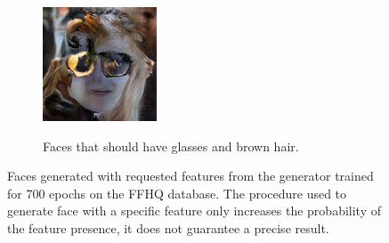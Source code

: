 \begin{figure}[!h]
\begin{subfigure}[b]{\textwidth}
{            \includegraphics[scale=0.485]{figures/ffhq/forced-glasses-hair-brown/ffhq128x128_glasses_yes_hair_color_brown0005.png}
        }
        \caption{Faces that should have glasses and brown hair.}
    \end{subfigure}
    \caption{\label{fig:appendix-ffhq-forced}Faces generated with requested features from the generator trained for 700 epochs on the FFHQ database. The procedure used to generate face with a specific feature only increases the probability of the feature presence, it does not guarantee a precise result.}
\end{figure}
